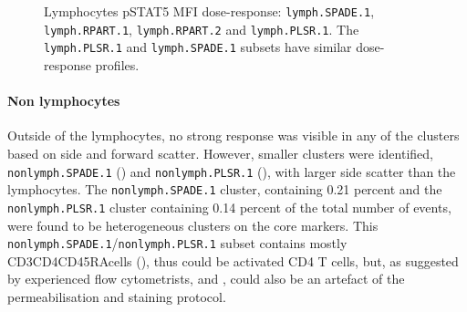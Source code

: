 \begin{figure}
\begin{minipage}{.5\textwidth}
\end{minipage}
\begin{minipage}{.3\textwidth}
{ Lymphocytes pSTAT5 MFI dose-response: \texttt{lymph.SPADE.1}, \texttt{lymph.RPART.1}, \texttt{lymph.RPART.2} and \texttt{lymph.PLSR.1}. }
{
    The \texttt{lymph.PLSR.1} and \texttt{lymph.SPADE.1} subsets have similar dose-response profiles.
}
\end{minipage}
\end{figure}




\clearpage


\paragraph{Non lymphocytes}
Outside of the lymphocytes, no strong response was visible in any of the clusters based on side and forward scatter.
However, smaller clusters were identified, \texttt{nonlymph.SPADE.1} () and \texttt{nonlymph.PLSR.1} (), with larger side scatter than the lymphocytes.
The \texttt{nonlymph.SPADE.1} cluster, containing 0.21 percent and the \texttt{nonlymph.PLSR.1} cluster containing 0.14 percent of the total number of events, were found to be heterogeneous clusters on the core markers.
This \texttt{nonlymph.SPADE.1}/\texttt{nonlymph.PLSR.1} subset contains mostly CD3\positive CD4\positive CD45RA\positive cells (), thus could be activated CD4 T cells, but, as suggested by experienced flow cytometrists,  and , could also be an artefact of the permeabilisation and staining protocol.


